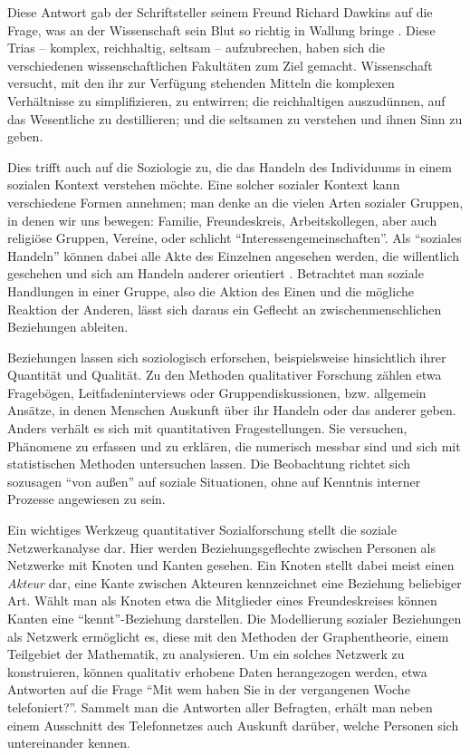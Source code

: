 \documentclass[11pt,a4paper,twoside]{article}
\begin{document}
Diese Antwort gab der Schriftsteller seinem Freund Richard Dawkins auf
die Frage, was an der Wissenschaft sein Blut so richtig in Wallung
bringe \autocite[S. 170]{Dawkins2004}. Diese Trias -- komplex,
reichhaltig, seltsam -- aufzubrechen, haben sich die verschiedenen
wissenschaftlichen Fakultäten zum Ziel gemacht. Wissenschaft versucht,
mit den ihr zur Verfügung stehenden Mitteln die komplexen Verhältnisse
zu simplifizieren, zu entwirren; die reichhaltigen auszudünnen, auf das
Wesentliche zu destillieren; und die seltsamen zu verstehen und ihnen
Sinn zu geben.

Dies trifft auch auf die Soziologie zu, die das Handeln des Individuums
in einem sozialen Kontext verstehen möchte. Eine solcher sozialer
Kontext kann verschiedene Formen annehmen; man denke an die vielen Arten
sozialer Gruppen, in denen wir uns bewegen: Familie, Freundeskreis,
Arbeitskollegen, aber auch religiöse Gruppen, Vereine, oder schlicht
\enquote{Interessengemeinschaften}. Als \enquote{soziales Handeln}
können dabei alle Akte des Einzelnen angesehen werden, die willentlich
geschehen und sich am Handeln anderer orientiert
\autocite[vgl.][]{Dimbath2016}. Betrachtet man soziale Handlungen in
einer Gruppe, also die Aktion des Einen und die mögliche Reaktion der
Anderen, lässt sich daraus ein Geflecht an zwischenmenschlichen
Beziehungen ableiten.

Beziehungen lassen sich soziologisch erforschen, beispielsweise
hinsichtlich ihrer Quantität und Qualität. Zu den Methoden qualitativer
Forschung zählen etwa Fragebögen, Leitfadeninterviews oder
Gruppendiskussionen, bzw. allgemein Ansätze, in denen Menschen Auskunft
über ihr Handeln oder das anderer geben.\\
Anders verhält es sich mit quantitativen Fragestellungen. Sie versuchen,
Phänomene zu erfassen und zu erklären, die numerisch messbar sind und
sich mit statistischen Methoden untersuchen lassen. Die Beobachtung
richtet sich sozusagen \enquote{von außen} auf soziale Situationen, ohne
auf Kenntnis interner Prozesse angewiesen zu sein.

Ein wichtiges Werkzeug quantitativer Sozialforschung stellt die soziale
Netzwerkanalyse dar. Hier werden Beziehungsgeflechte zwischen Personen
als Netzwerke mit Knoten und Kanten gesehen. Ein Knoten stellt dabei
meist einen \emph{Akteur} dar, eine Kante zwischen Akteuren kennzeichnet
eine Beziehung beliebiger Art. Wählt man als Knoten etwa die Mitglieder
eines Freundeskreises können Kanten eine \enquote{kennt}-Beziehung
darstellen. Die Modellierung sozialer Beziehungen als Netzwerk
ermöglicht es, diese mit den Methoden der Graphentheorie, einem
Teilgebiet der Mathematik, zu analysieren. Um ein solches Netzwerk zu
konstruieren, können qualitativ erhobene Daten herangezogen werden, etwa
Antworten auf die Frage \enquote{Mit wem haben Sie in der vergangenen
Woche telefoniert?}. Sammelt man die Antworten aller Befragten, erhält
man neben einem Ausschnitt des Telefonnetzes auch Auskunft darüber,
welche Personen sich untereinander kennen.
\end{document}
